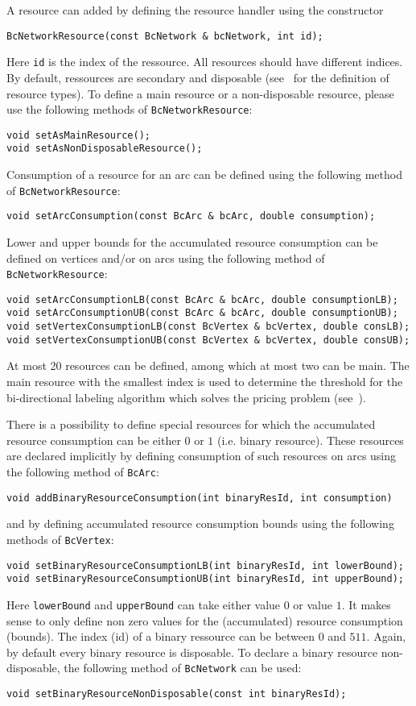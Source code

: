 \documentclass[10pt,a4paper]{article}
\begin{document}
A resource can added by defining the resource handler using the constructor
\begin{lstlisting}
BcNetworkResource(const BcNetwork & bcNetwork, int id);
\end{lstlisting}
Here \verb+id+ is the index of the ressource. All resources should have different indices. By default, ressources are
secondary and disposable (see~\cite{PessoaSadykovUchoa:20a} for the definition of resource types). To define a main
resource or a non-disposable resource, please use the following methods of \verb+BcNetworkResource+:
\begin{lstlisting}
void setAsMainResource();
void setAsNonDisposableResource();
\end{lstlisting}
Consumption of a resource for an arc can be defined using the following method of \verb+BcNetworkResource+:
\begin{lstlisting}
void setArcConsumption(const BcArc & bcArc, double consumption);
\end{lstlisting}
Lower and upper bounds for the accumulated resource consumption can be defined on vertices and/or on arcs using the
following method of \verb+BcNetworkResource+:
\begin{lstlisting}
void setArcConsumptionLB(const BcArc & bcArc, double consumptionLB);
void setArcConsumptionUB(const BcArc & bcArc, double consumptionUB);
void setVertexConsumptionLB(const BcVertex & bcVertex, double consLB);
void setVertexConsumptionUB(const BcVertex & bcVertex, double consUB);
\end{lstlisting}
At most 20 resources can be defined, among which at most two can be main. The main resource with the smallest
index is used to determine the threshold for the bi-directional labeling algorithm which solves the pricing problem
(see~\cite{SadykovUchoaPessoa:21l}).  

There is a possibility to define special resources for which the accumulated resource consumption can be either $0$ or
$1$ (i.e. binary resource). These resources are declared implicitly by defining consumption of such resources on arcs
using the following method of \verb+BcArc+:
\begin{lstlisting}
void addBinaryResourceConsumption(int binaryResId, int consumption)
\end{lstlisting}
and by defining accumulated resource consumption bounds using the following methods of \verb+BcVertex+:
\begin{lstlisting}
void setBinaryResourceConsumptionLB(int binaryResId, int lowerBound);
void setBinaryResourceConsumptionUB(int binaryResId, int upperBound);
\end{lstlisting}
Here \verb+lowerBound+ and \verb+upperBound+ can take either value $0$ or value $1$. It makes sense to only define non
zero values for the (accumulated) resource consumption (bounds). The index (id) of a binary ressource can
be between $0$ and $511$. Again, by default every binary resource is disposable. To declare a binary resource
non-disposable, the following method of \verb+BcNetwork+ can be used:
\begin{lstlisting}
void setBinaryResourceNonDisposable(const int binaryResId);
\end{lstlisting}
\end{document}
